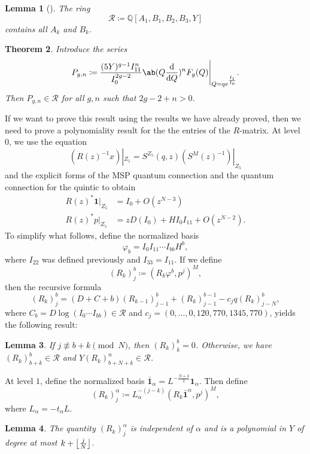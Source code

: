 \documentclass[10pt]{amsart}
\DeclarePairedDelimiter{\floor}{\lfloor}{\rfloor}
\newtheorem{thm}{Theorem}[section]
\newtheorem{lem}[thm]{Lemma}
\theoremstyle{definition}
\theoremstyle{remark}
\theoremstyle{plain}
\theoremstyle{definition}
\theoremstyle{remark}
\newcommand{\Q}{\mathbb{Q}}
\newcommand{\mc}[1]{\mathcal{#1}}
\newcommand{\1}{\mathbf{1}}
\newcommand{\2}{\mathbf{2}}
\newcommand{\3}{\mathbf{3}}
\begin{document}
\begin{lem}[\cite{yy04}]
    The ring
    \[ \mc{R} \coloneqq \Q[A_1, B_1, B_2, B_3, Y] \]
    contains all $A_k$ and $B_k$.
\end{lem}

\begin{thm}\label{thm:finitegenerationmsp}
    Introduce the series
    \[ P_{g,n} \coloneqq \frac{(5Y)^{g-1} I_{11}^n}{I_0^{2g-2}} \ab(Q \odv{}{Q})^n F_g(Q) \Bigg|_{Q = qe^{\frac{I_1}{I_0}}}. \]
    Then $P_{g,n} \in \mc{R}$ for all $g,n$ such that $2g-2+n > 0$.
\end{thm}

If we want to prove this result using the results we have already proved, then we need to prove a polynomiality result for the the entries of the $R$-matrix. At level $0$, we use the equation
\[ (R(z)^{-1}x)|_{Z_5} = S^{Z_5}(q,z) (S^M(z)^{-1})|_{Z_5} \]
and the explicit forms of the MSP quantum connection and the quantum connection for the quintic to obtain
\begin{align*}
    R(z)^* \1 |_{Z_5} &= I_0 + O(z^{N-3}) \\
    R(z)^* p |_{Z_5} &= z D(I_0) + H I_0 I_{11} + O(z^{N-2}).
\end{align*}
To simplify what follows, define the normalized basis
\[ \varphi_b = I_0 I_{11} \cdots I_{bb} H^b, \]
where $I_{22}$ was defined previously and $I_{33} = I_{11}$. If we define
\[ (R_k)_j^b \coloneqq (R_k \varphi^b, p^j)^M, \]
then the recursive formula
\[ (R_k)_j^b = (D+C+b)(R_{k-1})_{j-1}^b + (R_k)_{j-1}^{b-1} - c_j q (R_k)_{j-N}^b, \]
where $C_b = D \log (I_0 \cdots I_{bb}) \in \mc{R}$ and $c_j = (0,\ldots,0,120,770,1345,770)$, yields the following result:
\begin{lem}
    If $j \not\equiv b+k \pmod{N}$, then $(R_k)_k^b = 0$. Otherwise, we have $(R_k)_{b+k}^b \in \mc{R}$ and $Y (R_k)_{b+N+k}^n \in \mc{R}$.
\end{lem}

At level $1$, define the normalized basis $\bar{\1}_{\alpha} = L^{-\frac{N+3}{2}}\1_{\alpha}$. Then define
\[ (R_k)_j^{\alpha} \coloneqq L_{\alpha}^{-(j-k)} (R_k \bar{\1}^{\alpha}, p^j)^M, \]
where $L_{\alpha} = -t_{\alpha} L$.
\begin{lem}
    The quantity $(R_k)_j^{\alpha}$ is independent of $\alpha$ and is a polynomial in $Y$ of degree at most $k + \floor*{\frac{j}{N}}$.
\end{lem}
\end{document}
